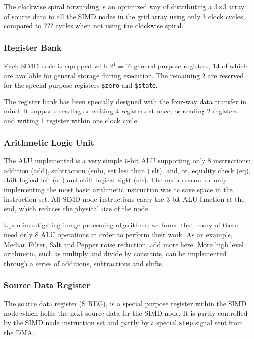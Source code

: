 The clockwise spiral forwarding is an optimized way of distributing a 3$\times$3
array of source data to all the \ac{SIMD} nodes in the grid array using only 3
clock cycles, compared to ??? cycles when not using the clockwise
spiral. 

\subsubsection{Register Bank}
Each \ac{SIMD} node is equipped with $2^4 = 16$ general purpose registers, 14 of
which are available for general storage during execution. The remaining 2 are
reserved for the special purpose registers {\tt \$zero} and {\tt \$state}.



The register bank has been specially designed with the four-way data transfer in
mind. It supports reading or writing 4 registers at once, or reading 2
registers and writing 1 register within one clock cycle.

\subsubsection{Arithmetic Logic Unit}

The \ac{ALU} implemented is a very simple {\tt 8}-bit \ac{ALU} supporting only 8
instructions: addition ({\sc add}), subtraction ({\sc sub}), set less than ({\sc
  slt}), {\sc and}, {\sc or}, equality check ({\sc eq}), shift logical left
({\sc sll}) and shift logical right ({\sc slr}). The main reason for only
implementing the most basic arithmetic instruction was to save space in the
instruction set. All \ac{SIMD} node instructions carry the 3-bit \ac{ALU}
function at the end, which reduces the physical size of the node.


Upon investigating image processing algorithms, we found that many of these need
only 8 \ac{ALU} operations in order to perform their work. As an example, Median
Filter, Salt and Pepper noise reduction, {\color{red} add more here}. More high
level arithmetic, such as multiply and divide by constants, can be implemented
through a series of additions, subtractions and shifts. 

\subsubsection{Source Data Register}
The source data register (S REG), is a special purpose register within the
\ac{SIMD} node which holds the next source data for the \ac{SIMD} node. It is
partly controlled by the \ac{SIMD} node instruction set and partly by a special
{\tt step} signal sent from the \ac{DMA}.

